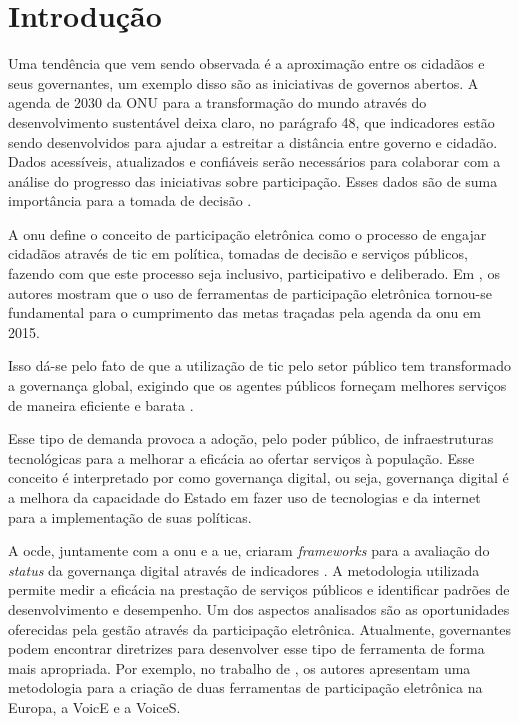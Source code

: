 \chapter[Introdução]{Introdução}
\label{cap:cap1}
Uma tendência que vem sendo observada é a aproximação entre os cidadãos e seus governantes, um exemplo disso são as iniciativas de governos abertos.
A agenda de 2030 da ONU para a transformação do mundo através do desenvolvimento sustentável deixa claro, no parágrafo 48, que
indicadores estão sendo desenvolvidos para ajudar a estreitar a distância entre governo e cidadão. Dados acessíveis, atualizados e confiáveis serão necessários para colaborar 
com a análise do progresso das iniciativas sobre participação. 
Esses dados são de suma importância para a tomada de decisão \cite{assembly2015transforming}.

\par
A \acrshort{onu} define o conceito de participação eletrônica como o processo de engajar cidadãos através de \acrfull{tic} em política, tomadas de decisão e
serviços públicos, fazendo com que este processo seja inclusivo, participativo e deliberado. Em , os autores mostram que o uso de 
ferramentas de participação eletrônica tornou-se fundamental para o cumprimento das metas traçadas pela agenda da \acrshort{onu} em 2015. 

\par
Isso dá-se pelo fato de que a utilização de \acrshort{tic} pelo setor público tem transformado a governança global, exigindo que os agentes públicos forneçam melhores serviços 
de maneira eficiente e barata \cite{afdb2014uneca}. 

\par
Esse tipo de demanda provoca a adoção, pelo poder público, de infraestruturas tecnológicas para a melhorar a eficácia ao ofertar serviços à população. Esse conceito é interpretado
por  como governança digital, ou seja, governança digital é a melhora da capacidade do Estado em fazer uso de tecnologias e da internet 
para a implementação de suas políticas.

\par
A \acrfull{ocde}, juntamente com a \acrshort{onu} e a \acrfull{ue}, criaram \textit{frameworks} para a avaliação do \textit{status} da governança digital através de indicadores \cite{onu2018}. A metodologia utilizada permite medir a eficácia na prestação de serviços públicos e identificar padrões de desenvolvimento e desempenho. Um dos aspectos analisados são as oportunidades oferecidas pela gestão através da participação eletrônica. 
Atualmente, governantes podem encontrar diretrizes para desenvolver esse tipo de ferramenta de forma mais apropriada.
Por exemplo,  no trabalho de , os autores apresentam uma metodologia para a criação de duas ferramentas de participação eletrônica na Europa, a VoicE e a VoiceS.


